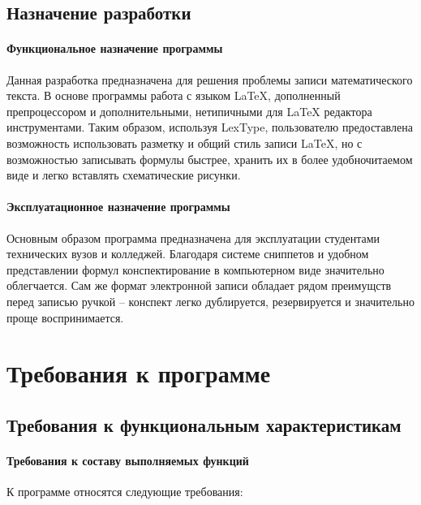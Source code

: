 \documentclass[explnote]{espd}
\begin{document}
\subsection{Назначение разработки}
\paragraph{Функциональное назначение программы}
Данная разработка предназначена для решения проблемы записи математического текста. В основе программы работа с языком LaTeX, дополненный препроцессором и дополнительными, нетипичными для LaTeX редактора инструментами. Таким образом, используя LexType, пользователю предоставлена возможность использовать разметку и общий стиль записи  LaTeX, но с возможностью записывать формулы быстрее, хранить их в более удобночитаемом виде и легко вставлять схематические рисунки.

\paragraph{Эксплуатационное назначение программы}
Основным образом программа предназначена для эксплуатации студентами технических вузов и колледжей. Благодаря системе сниппетов и удобном представлении формул конспектирование в компьютерном виде значительно облегчается. Сам же формат электронной записи обладает рядом преимущств перед записью ручкой -- конспект легко дублируется, резервируется и значительно проще воспринимается.

\section{Требования к программе}
\subsection{Требования к функциональным характеристикам}
\paragraph{Требования к составу выполняемых функций}
К программе относятся следующие требования:
\end{document}
